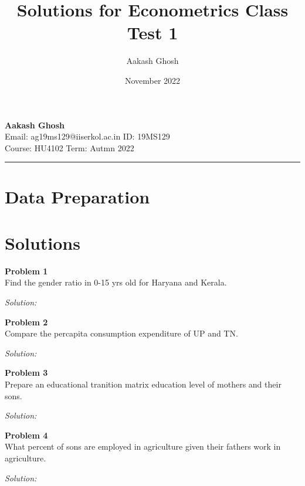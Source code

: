 \documentclass{article}
\title{Solutions for Econometrics Class Test 1 }
\author{Aakash Ghosh }
\date{November 2022}
\newenvironment{problem}[2][Problem]
    { \begin{mdframed}[backgroundcolor=gray!20] \textbf{#1 #2} \\}
    {  \end{mdframed}}
\newenvironment{solution}
    {\textit{Solution:}}
    {}
\begin{document}
\lstset{language=R}

\large\textbf{Aakash Ghosh} \hfill \textbf{}   \\
Email: ag19ms129@iiserkol.ac.in  \hfill ID: 19MS129 \\
\normalsize Course: HU4102 \hfill Term: Autmn 2022\\
\noindent\rule{7in}{2.8pt}
\section{Data Preparation}

\section{Solutions}
\begin{problem}{1}
Find the gender ratio in 0-15 yrs old for Haryana and Kerala.
\end{problem}
\begin{solution}

\end{solution} 

\begin{problem}{2}
Compare the percapita consumption expenditure of UP and TN.   
\end{problem}
\begin{solution}
    
\end{solution}


\begin{problem}{3}
Prepare an educational tranition matrix education level of mothers and their sons.
\end{problem}
\begin{solution}
    
\end{solution}


\begin{problem}{4}
What percent of sons are employed in agriculture given their fathers work in agriculture.
\end{problem}
\begin{solution}
    
\end{solution}
\end{document}
